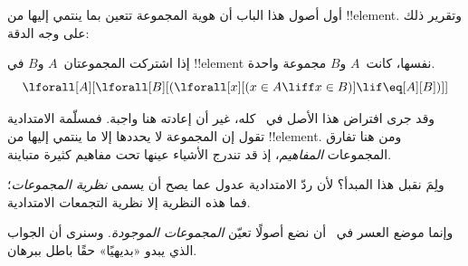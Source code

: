 \documentclass[../../../include/open-logic-section]{subfiles}
\begin{document}

أول أصول هذا الباب أن هوية المجموعة تتعين بما ينتمي إليها من
!!{element}. وتقرير ذلك على وجه الدقة:

\begin{axiom}[الامتدادية]
إذا اشتركت المجموعتان~$A$ و$B$ في !!{element} نفسها، كانت~$A$ و$B$
مجموعة واحدة.
\[
  \lforall[A][\lforall[B][(\lforall[x][(x \in A \liff x \in B)] \lif
  \eq[A][B])]]
\]
\end{axiom}

وقد جرى افتراض هذا الأصل في~ كله، غير أن إعادته
هنا واجبة. فمسلّمة الامتدادية تقول إن المجموعة لا يحددها إلا ما ينتمي
إليها من !!{element}. ومن هنا تفارق المجموعات \emph{المفاهيم}، إذ قد
تندرج الأشياء عينها تحت مفاهيم كثيرة متباينة.

ولِمَ نقبل هذا المبدأ؟ لأن ردّ الامتدادية عدول عما يصح أن يسمى
\emph{نظرية المجموعات}؛ فما هذه النظرية إلا نظرية التجمعات الامتدادية.

وإنما موضع العسر في~ أن نضع أصولًا تعيّن
\emph{المجموعات الموجودة}. وسنرى أن الجواب الذي يبدو «بديهيًا» حقًا
باطل ببرهان.
\end{document}
